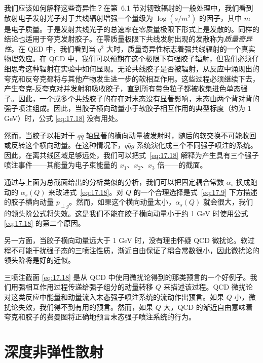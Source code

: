 我们应该如何解释这些奇异性？在第~6.1 节对轫致辐射的一般处理中，我们看到散射电子发射光子对于共线辐射增强一个量级为 $\log(s/m^2)$ 的因子，其中 $m$ 是电子质量。于是发射共线光子的总速率在零质量极限下形式上是发散的。同样的结论也适用于夸克发射胶子。在零质量极限下共线发射出现的发散称为\emph{质量奇异性}。在 QED 中，我们看到当 $q^2$ 大时，质量奇异性标志着强共线辐射的一个真实物理效应。在 QCD 中，我们可以预期在这个极限下有强胶子辐射，但我们必须仔细思考这种辐射在实验中如何显现。无论共线胶子是否被辐射，从反应中涌现出的夸克和反夸克都将与其他产物发生进一步的软相互作用。这些过程必须继续下去，产生夸克-反夸克对并发射和吸收胶子，直到所有带色粒子都被收集进色单态强子。因此，一个或多个共线胶子的存在对末态没有显著影响，末态由两个背对背的强子喷注组成。因此，当胶子横向动量小于软胶子相互作用的典型标度（约为 1 GeV）时，公式 \eqref{eq:17.18} 没有用处。

然而，当胶子以相对于 $q\bar{q}$ 轴显著的横向动量被发射时，随后的软交换不可能收回或反转这个横向动量。在这种情况下，$q\bar{q}g$ 系统演化成三个不同强子喷注的系统。因此，在离共线区域足够远处，我们可以把式~\eqref{eq:17.18} 解释为产生具有三个强子喷注事件——其能量为电子束能量的 $x_1$、$x_2$、$x_3$ 倍——的截面。

通过与上面为总截面给出的分析类似的分析，我们可以把固定耦合常数 $\alpha_s$ 换成跑动的 $\alpha_s(Q)$ 来改进式~\eqref{eq:17.18}。对 $Q$ 的一个合理选择是式~\eqref{eq:17.9} 下方描述的胶子横向动量 $p_{\perp g}$。然而，如果这个横向动量太小，$\alpha_s(Q)$ 就会很大，我们的领头阶公式将失效。这是我们不能在胶子横向动量小于约 1 GeV 时使用公式 \eqref{eq:17.18} 的第二个原因。

另一方面，当胶子横向动量远大于 1 GeV 时，没有理由怀疑 QCD 微扰论。软过程不可能干扰强子态的三喷注性质，渐近自由保证了耦合常数很小，因此微扰论的领头阶将是好的近似。

三喷注截面 \eqref{eq:17.18} 是从 QCD 中使用微扰论得到的那类预言的一个好例子。我们用强相互作用过程传递给强子组分的动量转移 $Q$ 来描述该过程。QCD 微扰论对这类反应中能量和动量流入末态强子喷注系统的流动作出预言。如果 $Q$ 小，微扰论失效，我们得不到有用的预言。然而，如果 $Q$ 大，QCD 的渐近自由意味着夸克和胶子的费曼图将正确地预言末态强子喷注系统的行为。

\section{深度非弹性散射}

